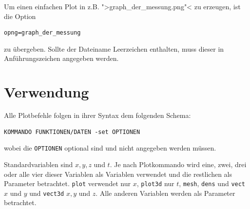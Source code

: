 \documentclass[DIV=14,headsepline,footsepline]{scrbook}
\begin{document}
				Um einen einfachen Plot in z.B. ">graph\_der\_messung.png"< zu erzeugen, ist die Option
				\begin{lstlisting}
opng=graph_der_messung
				\end{lstlisting}
				zu übergeben. Sollte der Dateiname Leerzeichen enthalten, muss dieser in Anführungszeichen angegeben werden.
				
			\section{Verwendung}
				Alle Plotbefehle folgen in ihrer Syntax dem folgenden Schema:
				\begin{lstlisting}
KOMMANDO FUNKTIONEN/DATEN -set OPTIONEN
				\end{lstlisting}
				wobei die \lstinline+OPTIONEN+ optional sind und nicht angegeben werden müssen.
				
				Standardvariablen sind $x, y, z$ und $t$. Je nach Plotkommando wird eine, zwei, drei oder alle vier dieser Variablen als Variablen verwendet und die restlichen als Parameter betrachtet. \lstinline+plot+ verwendet nur $x$, \lstinline+plot3d+ nur $t$, \lstinline+mesh+, \lstinline+dens+ und \lstinline+vect+ $x$ und $y$ und \lstinline+vect3d+ $x,y$ und $z$. Alle anderen Variablen werden als Parameter betrachtet.
				
\end{document}

